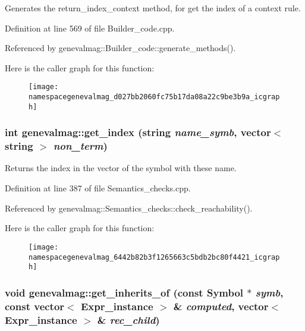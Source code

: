 Generates the return\_\-index\_\-context method, for get the index of a context rule. 

Definition at line 569 of file Builder\_\-code.cpp.

Referenced by genevalmag::Builder\_\-code::generate\_\-methods().

Here is the caller graph for this function:\nopagebreak
\begin{figure}[H]
\begin{center}
\leavevmode
\texttt{[image: namespacegenevalmag\_d027bb2060fc75b17da08a22c9be3b9a\_icgraph]}
\end{center}
\end{figure}
\hypertarget{namespacegenevalmag_6442b82b3f1265663c5bdb2bc80f4421}{
\subsubsection[{get\_\-index}]{\setlength{\rightskip}{0pt plus 5cm}int genevalmag::get\_\-index (string {\em name\_\-symb}, \/  vector$<$ string $>$ {\em non\_\-term})}}
\label{namespacegenevalmag_6442b82b3f1265663c5bdb2bc80f4421}


Returns the index in the vector of the symbol with these name. 

Definition at line 387 of file Semantics\_\-checks.cpp.

Referenced by genevalmag::Semantics\_\-checks::check\_\-reachability().

Here is the caller graph for this function:\nopagebreak
\begin{figure}[H]
\begin{center}
\leavevmode
\texttt{[image: namespacegenevalmag\_6442b82b3f1265663c5bdb2bc80f4421\_icgraph]}
\end{center}
\end{figure}
\hypertarget{namespacegenevalmag_e77f9a26f51553fb1419a41295da521a}{
\subsubsection[{get\_\-inherits\_\-of}]{\setlength{\rightskip}{0pt plus 5cm}void genevalmag::get\_\-inherits\_\-of (const {\bf Symbol} $\ast$ {\em symb}, \/  const vector$<$ {\bf Expr\_\-instance} $>$ \& {\em computed}, \/  vector$<$ {\bf Expr\_\-instance} $>$ \& {\em rec\_\-child})}}
\label{namespacegenevalmag_e77f9a26f51553fb1419a41295da521a}


